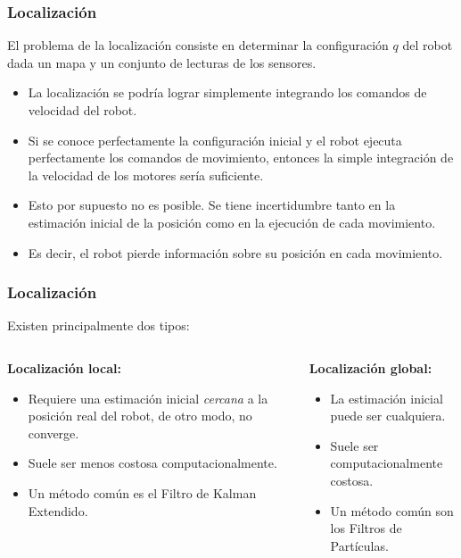 \begin{frame}\frametitle{Localización}
  El problema de la localización consiste en determinar la configuración $q$ del robot dada un mapa y un conjunto de lecturas de los sensores.
  \begin{itemize}
  \item La localización se podría lograr simplemente integrando los comandos de velocidad del robot.
  \item Si se conoce perfectamente la configuración inicial y el robot ejecuta perfectamente los comandos de movimiento, entonces la simple integración de la velocidad de los motores sería suficiente.
  \item Esto por supuesto no es posible. Se tiene incertidumbre tanto en la estimación inicial de la posición como en la ejecución de cada movimiento.
  \item Es decir, el robot pierde información sobre su posición en cada movimiento. 
  \end{itemize}
\end{frame}

\begin{frame}\frametitle{Localización}
  Existen principalmente dos tipos:
\[\]
  \begin{columns}
    \begin{column}{0.5\textwidth}
      \textbf{Localización local: }
      \begin{itemize}
      \item Requiere una estimación inicial \textit{cercana} a la posición real del robot, de otro modo, no converge.
      \item Suele ser menos costosa computacionalmente.
      \item Un método común es el Filtro de Kalman Extendido.
      \end{itemize}
    \end{column}
    \begin{column}{0.5\textwidth}
      \textbf{Localización global:}
      \begin{itemize}
      \item La estimación inicial puede ser cualquiera.
      \item Suele ser computacionalmente costosa.
      \item Un método común son los Filtros de Partículas. 
      \end{itemize}
      \[\]
      \[\]
    \end{column}
  \end{columns}
\end{frame}

